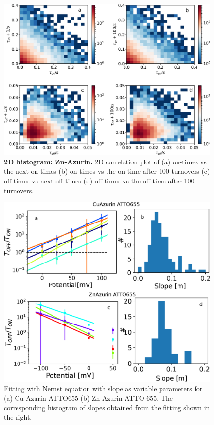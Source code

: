 \documentclass[11pt,a4paper,onecolumn]{article}
\begin{document}
\begin{figure}
  \centering
  \includegraphics[width=\textwidth,keepaspectratio]{Figure_SI/SI_on_off_2D_histogram_Zn.png}
	\makeatletter
	\renewcommand{\fnum@figure}{\figurename~S\thefigure}
	\makeatother
  \caption{\textbf{2D histogram: Zn-Azurin.} 2D correlation plot of (a) on-times vs the next on-times (b) on-times vs the on-time after 100 turnovers (c) off-times vs next off-times (d) off-times vs the off-time after 100 turnovers.}
  \label{SIfig:tracecomparision}
\end{figure}
\begin{figure}
  \centering
  \includegraphics[width=\textwidth,keepaspectratio]{Figure_SI/SI_potential_slope.eps}
	\makeatletter
	\renewcommand{\fnum@figure}{\figurename~S\thefigure}
	\makeatother
  \caption{Fitting with Nernst equation with slope as variable parameters for  (a) Cu-Azurin ATTO655 (b) Zn-Azurin ATTO 655. The corresponding histogram of slopes obtained from the fitting shown in the right.}
  \label{SIfig:potential_slope}
\end{figure}
%
\end{document}
